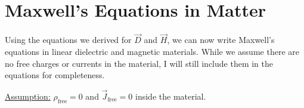 \documentclass[12pt]{article}
\begin{document}
\section*{Maxwell's Equations in Matter}
Using the equations we derived for $\vec{D}$ and $\vec{H}$, we can now write Maxwell's equations in linear dielectric and magnetic materials. While we assume there are no free charges or currents in the material, I will still include them in the equations for completeness.
\begin{center}
\end{center}
\underline{Assumption:} $\rho_\text{free} = 0$ and $\vec{J}_\text{free} = 0$ inside the material.
\end{document}
